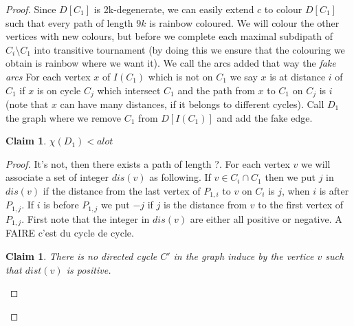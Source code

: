 \documentclass[10pt]{article}
\theoremstyle{plain}
\newtheorem{claim}[theorem]{Claim}
\theoremstyle{definition}
\theoremstyle{remark}
\begin{document}
\begin{proof}
Since $D[C_1]$ is 2k-degenerate, we can easily extend $c$ to colour $D[C_1]$ such that every path of length $9k$ is rainbow coloured. 
We will colour the other vertices with  new colours, but before we complete each maximal subdipath of $C_i \setminus C_1$ into transitive tournament
(by doing this we ensure that the colouring we obtain is rainbow where we want it). We call the arcs added that way the \textit{fake arcs}  
For each vertex $x$ of $I(C_1)$ which is not on $C_1$ we say $x$ is at distance $i$
of $C_1$ if $x$ is on cycle $C_j$ which intersect $C_1$ and the path from $x$ to $C_1$ on $C_j$ is $i$
(note that $x$ can have many distances, if it belongs to different cycles). Call $D_1$ the graph where we remove $C_1$ from $D[I(C_1)]$ and add the fake
edge.

\begin{claim}
$\chi(D_1) < a lot$ 
\end{claim}

\begin{proof}
It's not, then there exists a path of length ?. 
For each vertex $v$ we will associate a set of integer $dis(v)$ as following. If $v \in C_i \cap C_1$ then we put $j$ in $dis(v)$ if the distance
from the last vertex of $P_{1,i}$ to $v$ on $C_i$ is $j$, when $i$ is after $P_{1,j}$. If  $i$ is before $P_{1,j}$ we put $-j$ if $j$ is the distance from
$v$ to the first vertex of $P_{1,j}$. 
First note that the integer in $dis(v)$ are either all positive or negative. A FAIRE c'est du cycle de cycle.

\begin{claim}\label{CycleDis}
There is no directed cycle $C'$ in the graph induce by the vertice $v$ such that $dist(v)$ is positive.
\end{claim}


\end{proof}
\end{proof}
\end{document}
